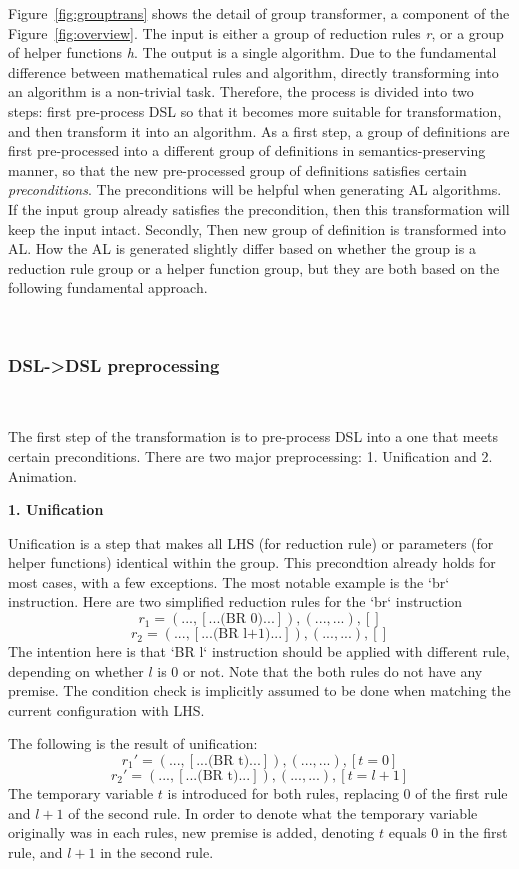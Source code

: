 Figure~\ref{fig:grouptrans} shows the detail of group transformer, a component of the Figure~\ref{fig:overview}.
The input is either a group of reduction rules \textit{r}, or a group of helper functions \textit{h}.
The output is a single algorithm.
Due to the fundamental difference between mathematical rules and algorithm,
directly transforming into an algorithm is a non-trivial task.
Therefore, the process is divided into two steps: first pre-process DSL so that
it becomes more suitable for transformation, and then transform it into an algorithm.
As a first step, a group of definitions are first pre-processed into a
different group of definitions in semantics-preserving manner,
so that the new pre-processed group of definitions satisfies certain \textit{preconditions}.
The preconditions will be helpful when generating AL algorithms.
If the input group already satisfies the precondition, then this transformation will keep the input intact.
Secondly, Then new group of definition is transformed into AL.
How the AL is generated slightly differ based on whether the group is a reduction rule group or a helper function
group, but they are both based on the following fundamental approach.

~

\subsubsection{\textbf{DSL->DSL preprocessing}}~

The first step of the transformation is to pre-process DSL into a one that meets certain preconditions.
There are two major preprocessing: 1. Unification and
2. Animation.

\textbf{1. Unification}

Unification is a step that makes all LHS (for reduction rule) or parameters
(for helper functions) identical within the group.
This precondtion already holds for most cases, with a few exceptions.
The most notable example is the `br` instruction.
Here are two simplified reduction rules for the `br` instruction
\[
r_1 = (..., [... \text{(BR 0)} ...]),  (..., ...), []
\]
\[
r_2 = (..., [... \text{(BR l+1)} ...]),  (..., ...), []
\]
The intention here is that `BR l` instruction should be applied with different rule,
depending on whether $l$ is 0 or not.
Note that the both rules do not have any premise. The condition check is implicitly assumed to be
done when matching the current configuration with LHS.

The following is the result of unification:
\[
r_1' = (..., [... \text{(BR t)} ...]),  (..., ...), [t = 0]
\]
\[
r_2' = (..., [... \text{(BR t)} ...]),  (..., ...), [t = l + 1]
\]
The temporary variable $t$ is introduced for both rules, replacing 0 of the first rule and
$l+1$ of the second rule. In order to denote what the temporary variable originally was
in each rules, new premise is added, denoting $t$ equals 0 in the first rule, and $l+1$ in the second rule.

